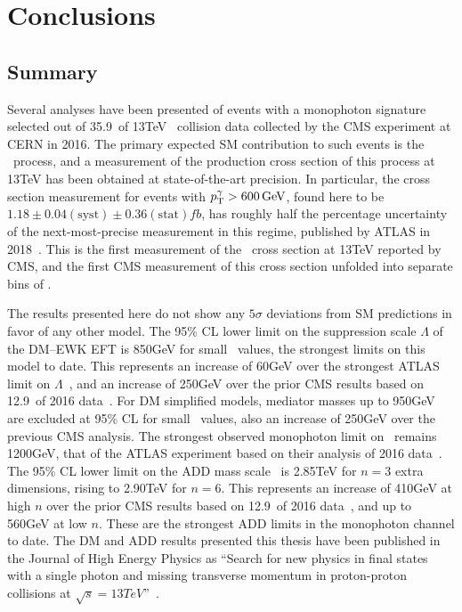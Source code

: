 \chapter{Conclusions} \label{chap:conclusions}
\section{Summary} \label{sec:conclusions_summary}
Several analyses have been presented of events with a monophoton signature selected out of 35.9\fbinv\ of 13\unit{TeV} \Pp\Pp\ collision
data collected by the CMS experiment at CERN in 2016. The primary expected SM contribution to such events is
the \zinvg\ process, and a measurement of the production cross section of this process at 13\unit{TeV} has been obtained at state-of-the-art
precision. In particular, the cross section measurement for events with $\pTgamma > 600\unit{GeV}$, found here to be
$1.18 \pm 0.04\mathrm{(syst)} \pm 0.36\mathrm{(stat)}\unit{fb}$, has roughly half the percentage uncertainty of the next-most-precise
measurement in this regime, published by ATLAS in 2018~\cite{ref:CERN-EP-2018-220}. This is the first measurement of the \zinvg\ cross section
at 13\unit{TeV} reported by CMS, and the first CMS measurement of this cross section unfolded into separate bins of \pTgamma.

The results presented here do not show any $5\sigma$ deviations from SM predictions in favor of any other model.
The 95\% CL lower limit on the suppression scale $\Lambda$ of the DM--EWK EFT is 850\unit{GeV} for small \mdm\ values, the strongest
limits on this model to date. This represents an increase of 60\unit{GeV} over the strongest ATLAS limit on $\Lambda$~\cite{ref:epjc/s10052-017-4965-8},
and an increase of 250\unit{GeV} over the prior CMS results based on 12.9\fbinv\ of 2016 data~\cite{ref:JHEP10(2017)073}.
For DM simplified models, mediator masses up to 950\unit{GeV} are excluded at 95\% CL for small \mdm\ values,
also an increase of 250\unit{GeV} over the previous CMS analysis. The strongest observed monophoton limit on \mmed\ remains
1200\unit{GeV}, that of the ATLAS experiment based on their analysis of 2016 data~\cite{ref:epjc/s10052-017-4965-8}.
The 95\% CL lower limit on the ADD mass scale \mD\ is 2.85\unit{TeV} for $n = 3$ extra dimensions, rising to 2.90\unit{TeV} for $n = 6$.
This represents an increase of 410\unit{GeV} at high $n$ over the prior CMS results based on 12.9\fbinv\ of 2016 data~\cite{ref:JHEP10(2017)073},
and up to 560\unit{GeV} at low $n$. These are the strongest ADD limits in the monophoton channel to date.
The DM and ADD results presented this thesis have been published in the Journal of High Energy Physics as ``Search for new physics in final states with
a single photon and missing transverse momentum in proton-proton collisions at $\sqrt{s} = 13\unit{TeV}$''~\cite{ref:JHEP02(2019)074}.

